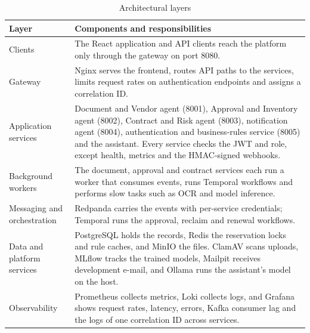 \begin{table}[!htbp]
\centering\tablestyle
\caption{Architectural layers}\label{tab:layers}
\begin{tabularx}{\textwidth}{|L{0.19\textwidth}|Y|}
\hline
\textbf{Layer} & \textbf{Components and responsibilities} \\ \hline
Clients & The React application and API clients reach the platform only through the gateway on port 8080. \\ \hline
Gateway & Nginx serves the frontend, routes API paths to the services, limits request rates on authentication endpoints and assigns a correlation ID. \\ \hline
Application services & Document and Vendor agent (8001), Approval and Inventory agent (8002), Contract and Risk agent (8003), notification agent (8004), authentication and business-rules service (8005) and the assistant. Every service checks the JWT and role, except health, metrics and the HMAC-signed webhooks. \\ \hline
Background workers & The document, approval and contract services each run a worker that consumes events, runs Temporal workflows and performs slow tasks such as OCR and model inference. \\ \hline
Messaging and orchestration & Redpanda carries the events with per-service credentials; Temporal runs the approval, reclaim and renewal workflows. \\ \hline
Data and platform services & PostgreSQL holds the records, Redis the reservation locks and rule caches, and MinIO the files. ClamAV scans uploads, MLflow tracks the trained models, Mailpit receives development e-mail, and Ollama runs the assistant's model on the host. \\ \hline
Observability & Prometheus collects metrics, Loki collects logs, and Grafana shows request rates, latency, errors, Kafka consumer lag and the logs of one correlation ID across services. \\ \hline
\end{tabularx}
\end{table}

